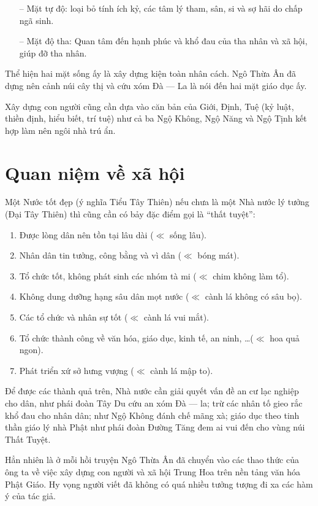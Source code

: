 \begin{itemize}
   \item[–] Mặt tự độ: loại bỏ tính ích kỷ, các tâm lý tham, sân, si và sợ hãi do chấp ngã sinh.
   \item[–] Mặt độ tha: Quan tâm đến hạnh phúc và khổ đau của tha nhân và xã hội, giúp đỡ tha nhân.
\end{itemize}

Thể hiện hai mặt sống ấy là xây dựng kiện toàn nhân cách. Ngô Thừa Ân đã dựng nên cảnh núi cây thị và cứu xóm Đà — La là nói đến hai mặt giáo dục ấy.

Xây dựng con người cũng cần dựa vào căn bản của Giới, Định, Tuệ (kỷ luật, thiền định, hiểu biết, trí tuệ) như cả ba Ngộ Không, Ngộ Năng và Ngộ Tịnh kết hợp làm nên ngôi nhà trú ẩn.

\section{Quan niệm về xã hội} %
\label{sec:67_xa_hoi}

Một Nước tốt đẹp (ý nghĩa Tiểu Tây Thiên) nếu chưa là một Nhà nước lý tưởng (Đại Tây Thiên) thì cũng cần có bảy đặc điểm gọi là ``thất tuyệt'':

\begin{enumerate}[label=\itshape\arabic*\upshape/]

    \item Được lòng dân nên tồn tại lâu dài ($\ll$ sống lâu).

    \item Nhân dân tin tưởng, công bằng và vì dân ($\ll$ bóng mát).

    \item Tổ chức tốt, không phát sinh các nhóm tà mi ($\ll$ chim không làm tổ).

    \item Không dung dưỡng hạng sâu dân mọt nước ($\ll$ cành lá không có sâu bọ).

    \item Các tổ chức và nhân sự tốt ($\ll$ cành lá vui mắt).

    \item Tổ chức thành công về văn hóa, giáo dục, kinh tế, an ninh, \ldots ($\ll$ hoa quả ngon).

    \item Phát triển xứ sở hưng vượng ($\ll$ cành lá mập to).
\end{enumerate}

Để được các thành quả trên, Nhà nước cần giải quyết vấn đề an cư lạc nghiệp cho dân, như phái đoàn Tây Du cứu an xóm Đà — la; trừ các nhân tố gieo rắc khổ đau cho nhân dân; như Ngộ Không đánh chế mãng xà; giáo dục theo tinh thần giáo lý nhà Phật như phái đoàn Đường Tăng đem ai vui đến cho vùng núi Thất Tuyệt.

Hẳn nhiên là ở mỗi hồi truyện Ngô Thừa Ân đã chuyển vào các thao thức của ông ta về việc xây dựng con người và xã hội Trung Hoa trên nền tảng văn hóa Phật Giáo. Hy vọng người viết đã không có quá nhiều tưởng tượng đi xa các hàm ý của tác giả.
